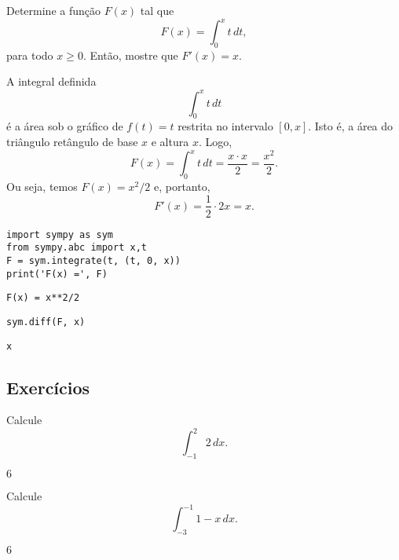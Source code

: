 \begin{exeresol}
  Determine a função $F(x)$ tal que
  \begin{equation}
    F(x) = \int_0^x t\,dt,
  \end{equation}
  para todo $x\geq 0$. Então, mostre que $F'(x) = x$.
\end{exeresol}
\begin{resol}
  A integral definida
  \begin{equation}
    \int_0^x t\,dt
  \end{equation}
  é a área sob o gráfico de $f(t) = t$ restrita no intervalo $[0, x]$. Isto é, a área do triângulo retângulo de base $x$ e altura $x$. Logo,
  \begin{equation}
    F(x) = \int_0^x t\,dt = \frac{x\cdot x}{2} = \frac{x^2}{2}.
  \end{equation}
  Ou seja, temos $F(x) = x^2/2$ e, portanto,
  \begin{equation}
    F'(x) = \frac{1}{2}\cdot 2x = x.
  \end{equation}

\begin{lstlisting}
import sympy as sym
from sympy.abc import x,t
F = sym.integrate(t, (t, 0, x))
print('F(x) =', F)
\end{lstlisting}

\begin{verbatim}
F(x) = x**2/2  
\end{verbatim}

\begin{lstlisting}
sym.diff(F, x)
\end{lstlisting}

\begin{verbatim}
x
\end{verbatim}

\end{resol}

\subsection{Exercícios}

\begin{exer}
  Calcule
  \begin{equation}
    \int_{-1}^2 2\,dx.
  \end{equation}
\end{exer}
\begin{resp}
  $6$
\end{resp}

\begin{exer}
  Calcule
  \begin{equation}
    \int_{-3}^{-1} 1-x\,dx.
  \end{equation}
\end{exer}
\begin{resp}
  $6$
\end{resp}


